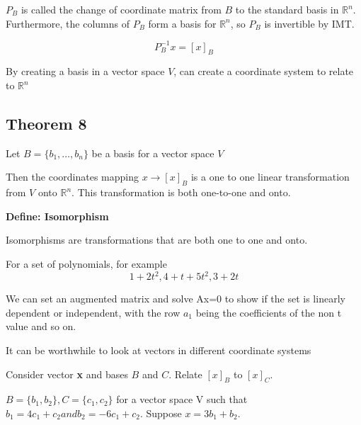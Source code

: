 $P_{B}$ is called the change of coordinate matrix from $B$ to the standard basis in $\mathbb{R}^{n}$. Furthermore, the columns of $P_{B}$ form a basis for $\mathbb{R}^{n}$, so $P_{B}$ is invertible by IMT. 

\begin{equation}
	\label{}
	P_{B}^{-1} x = [x]_{B}
\end{equation}


By creating a basis in a vector space $V$, can create a coordinate system to relate to $\mathbb{R}^{n}$

\subsection{Theorem 8}
Let $B=\{b_{1},\ldots,b_{n}\}$ be a basis for a vector space $V$

\hfill

Then the coordinates mapping $x\to [x]_{B}$ is a one to one linear transformation from $V$ onto $\mathbb{R}^{n}$. This transformation is both one-to-one and onto. 


\textbf{Define: Isomorphism}

Isomorphisms are transformations that are both one to one and onto. 



For a set of polynomials, for example
\begin{equation}
	\label{}
	1+2t^{2},4+t+5t^{2},3+2t
\end{equation}

We can set an augmented matrix and solve Ax=0 to show if the set is linearly dependent or independent, with the row $a_{1}$ being the coefficients of the non t value and so on.


\hfill

It can be worthwhile to look at vectors in different coordinate systems

Consider vector \textbf{x} and bases $B$ and $C$. Relate $[x]_{B}$ to $[x]_{C}$.

$B=\{b_{1},b_{2}\}, C=\{c_{1},c_{2}\}$ for a vector space V such that $b_{1}=4c_{1}+c_{2} and b_{2}=-6c_{1}+c_{2}$. Suppose $x=3b_{1}+b_{2}$.

